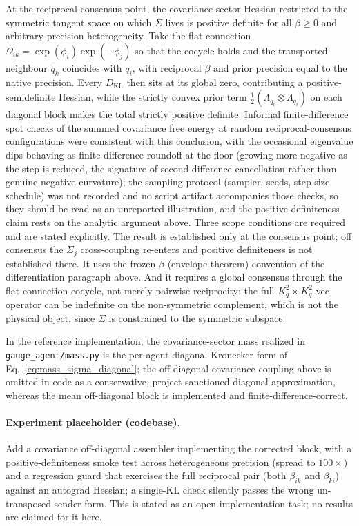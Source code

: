 \documentclass[11pt]{article}
\begin{document}
At the reciprocal-consensus point, the covariance-sector Hessian restricted to the symmetric tangent space on which $\Sigma$ lives is positive definite for all $\beta \geq 0$ and arbitrary precision heterogeneity. Take the flat connection $\Omega_{ik} = \exp(\phi_i)\exp(-\phi_j)$ so that the cocycle holds and the transported neighbour $\tilde{q}_k$ coincides with $q_i$, with reciprocal $\beta$ and prior precision equal to the native precision. Every $D_{\mathrm{KL}}$ then sits at its global zero, contributing a positive-semidefinite Hessian, while the strictly convex prior term $\frac{1}{2}(\Lambda_{q_i} \otimes \Lambda_{q_i})$ on each diagonal block makes the total strictly positive definite. Informal finite-difference spot checks of the summed covariance free energy at random reciprocal-consensus configurations were consistent with this conclusion, with the occasional eigenvalue dips behaving as finite-difference roundoff at the floor (growing more negative as the step is reduced, the signature of second-difference cancellation rather than genuine negative curvature); the sampling protocol (sampler, seeds, step-size schedule) was not recorded and no script artifact accompanies those checks, so they should be read as an unreported illustration, and the positive-definiteness claim rests on the analytic argument above. Three scope conditions are required and are stated explicitly. The result is established only at the consensus point; off consensus the $\Sigma_j$ cross-coupling re-enters and positive definiteness is not established there. It uses the frozen-$\beta$ (envelope-theorem) convention of the differentiation paragraph above. And it requires a global consensus through the flat-connection cocycle, not merely pairwise reciprocity; the full $K_q^2 \times K_q^2$ vec operator can be indefinite on the non-symmetric complement, which is not the physical object, since $\Sigma$ is constrained to the symmetric subspace.

In the reference implementation, the covariance-sector mass realized in \texttt{gauge\_agent/mass.py} is the per-agent diagonal Kronecker form of Eq.~\eqref{eq:mass_sigma_diagonal}; the off-diagonal covariance coupling above is omitted in code as a conservative, project-sanctioned diagonal approximation, whereas the mean off-diagonal block is implemented and finite-difference-correct.

\paragraph{Experiment placeholder (codebase).} Add a covariance off-diagonal assembler implementing the corrected block, with a positive-definiteness smoke test across heterogeneous precision (spread to $100\times$) and a regression guard that exercises the full reciprocal pair (both $\beta_{ik}$ and $\beta_{ki}$) against an autograd Hessian; a single-KL check silently passes the wrong un-transposed sender form. This is stated as an open implementation task; no results are claimed for it here.
\end{document}
